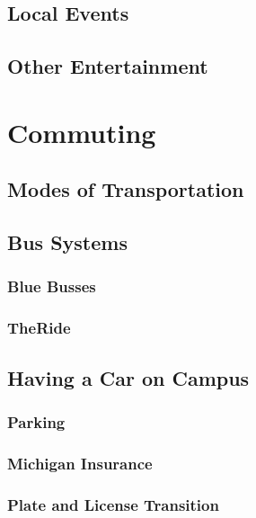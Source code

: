 \documentclass[
]{book}
\begin{document}
\hypertarget{local-events}{%
\section{Local Events}\label{local-events}}

\hypertarget{other-entertainment}{%
\section{Other Entertainment}\label{other-entertainment}}

\hypertarget{commuting}{%
\chapter{Commuting}\label{commuting}}

\hypertarget{modes-of-transportation}{%
\section{Modes of Transportation}\label{modes-of-transportation}}

\hypertarget{bus-systems}{%
\section{Bus Systems}\label{bus-systems}}

\hypertarget{blue-busses}{%
\subsection{Blue Busses}\label{blue-busses}}

\hypertarget{theride}{%
\subsection{TheRide}\label{theride}}

\hypertarget{having-a-car-on-campus}{%
\section{Having a Car on Campus}\label{having-a-car-on-campus}}

\hypertarget{parking}{%
\subsection{Parking}\label{parking}}

\hypertarget{michigan-insurance}{%
\subsection{Michigan Insurance}\label{michigan-insurance}}

\hypertarget{plate-and-license-transition}{%
\subsection{Plate and License Transition}\label{plate-and-license-transition}}

  
\end{document}
